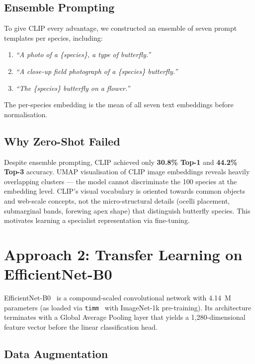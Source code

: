 \documentclass[journal, twocolumn]{IEEEtran}
\begin{document}
\subsection{Ensemble Prompting}

To give CLIP every advantage, we constructed an ensemble of seven prompt templates per species, including:
\begin{enumerate}
    \item \textit{``A photo of a \{species\}, a type of butterfly.''}
    \item \textit{``A close-up field photograph of a \{species\} butterfly.''}
    \item \textit{``The \{species\} butterfly on a flower.''}
\end{enumerate}

The per-species embedding is the mean of all seven text embeddings before normalisation.

\subsection{Why Zero-Shot Failed}

Despite ensemble prompting, CLIP achieved only \textbf{30.8\% Top-1} and \textbf{44.2\% Top-3} accuracy. UMAP visualisation of CLIP image embeddings reveals heavily overlapping clusters — the model cannot discriminate the 100 species at the embedding level. CLIP's visual vocabulary is oriented towards common objects and web-scale concepts, not the micro-structural details (ocelli placement, submarginal bands, forewing apex shape) that distinguish butterfly species. This motivates learning a specialist representation via fine-tuning.

\section{Approach 2: Transfer Learning on EfficientNet-B0}

EfficientNet-B0~\cite{tan2019efficientnet} is a compound-scaled convolutional network with 4.14~M parameters (as loaded via \texttt{timm}~\cite{rw2019timm} with ImageNet-1k pre-training). Its architecture terminates with a Global Average Pooling layer that yields a 1,280-dimensional feature vector before the linear classification head.

\subsection{Data Augmentation}
\end{document}
